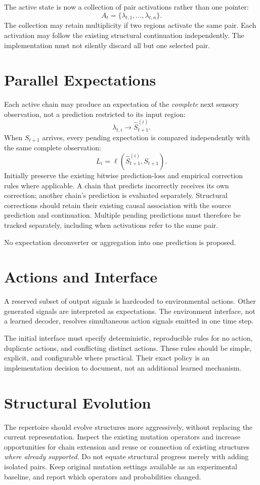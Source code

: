 \documentclass[11pt]{article}
\begin{document}
The active state is now a collection of pair activations rather than one pointer:
\[
A_t=\{\lambda_{t,1},\ldots,\lambda_{t,n}\}.
\]
The collection may retain multiplicity if two regions activate the same pair. Each activation may follow the existing structural continuation independently. The implementation must not silently discard all but one selected pair.

\section{Parallel Expectations}
Each active chain may produce an expectation of the \emph{complete} next sensory observation, not a prediction restricted to its input region:
\[
\lambda_{t,i}\longrightarrow \widehat{S}_{t+1}^{(i)}.
\]
When $S_{t+1}$ arrives, every pending expectation is compared independently with the same complete observation:
\[
L_i=\ell\!\left(\widehat{S}_{t+1}^{(i)},S_{t+1}\right).
\]
Initially preserve the existing bitwise prediction-loss and empirical correction rules where applicable. A chain that predicts incorrectly receives its own correction; another chain's prediction is evaluated separately. Structural corrections should retain their existing causal association with the source prediction and continuation. Multiple pending predictions must therefore be tracked separately, including when activations refer to the same pair.

No expectation deconverter or aggregation into one prediction is proposed.

\section{Actions and Interface}
A reserved subset of output signals is hardcoded to environmental actions. Other generated signals are interpreted as expectations. The environment interface, not a learned decoder, resolves simultaneous action signals emitted in one time step.

The initial interface must specify deterministic, reproducible rules for no action, duplicate actions, and conflicting distinct actions. These rules should be simple, explicit, and configurable where practical. Their exact policy is an implementation decision to document, not an additional learned mechanism.

\section{Structural Evolution}
The repertoire should evolve structures more aggressively, without replacing the current representation. Inspect the existing mutation operators and increase opportunities for chain extension and reuse or connection of existing structures \emph{where already supported}. Do not equate structural progress merely with adding isolated pairs. Keep original mutation settings available as an experimental baseline, and report which operators and probabilities changed.
\end{document}
